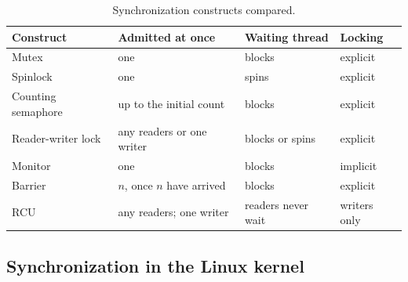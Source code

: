 \documentclass[../main.tex]{subfiles}
\begin{document}
\begin{table}[htbp]
  \centering
  \caption{Synchronization constructs compared.}
  \label{tab:l10-constructs}
  \small
  \begin{tabular}{@{}lp{32mm}p{30mm}l@{}}
    \toprule
    Construct & Admitted at once & Waiting thread & Locking \\
    \midrule
    Mutex              & one                         & blocks            & explicit \\
    Spinlock           & one                         & spins             & explicit \\
    Counting semaphore & up to the initial count     & blocks            & explicit \\
    Reader-writer lock & any readers or one writer   & blocks or spins   & explicit \\
    Monitor            & one                         & blocks            & implicit \\
    Barrier            & $n$, once $n$ have arrived  & blocks            & explicit \\
    RCU                & any readers; one writer     & readers never wait & writers only \\
    \bottomrule
  \end{tabular}
\end{table}

\subsection{Synchronization in the Linux kernel}
\label{sec:l10-linux}
\end{document}
